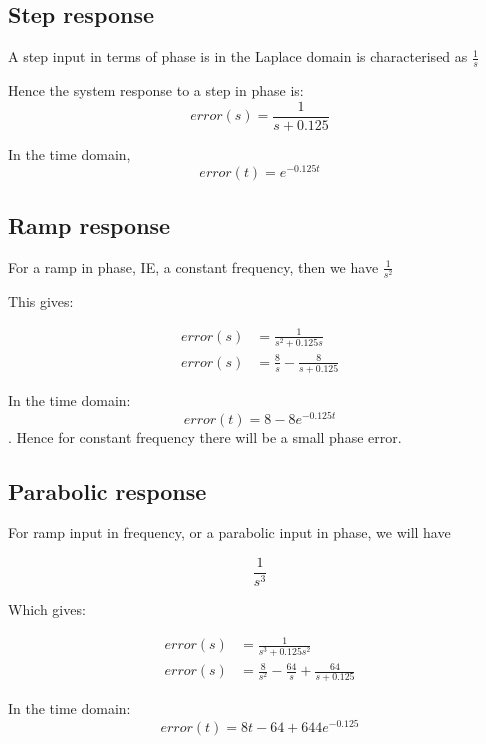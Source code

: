 \subsection{Step response}
A step input in terms of phase is in the Laplace domain is characterised as  $\frac{1}{s}$

Hence the system response to a step in phase is:
\begin{equation}
error(s) = \frac{1}{s+0.125}
\end{equation}

In the time domain,
\begin{equation}
 error(t) =  e^{-0.125t}
\end{equation}


\subsection{Ramp response}
For a ramp in phase, IE, a constant frequency, then we have $\frac{1}{s^2}$

This gives:

\begin{align}
error(s) &= \frac{1}{s^2+0.125s}\\
error(s) &= \frac{8}{s} - \frac{8}{s+0.125} 
\end{align}

In the time domain:
\begin{equation}
error(t) =  8 - 8e^{-0.125t}
\end{equation}
.
Hence for constant frequency there will be a small phase error.

\subsection{Parabolic response}
For ramp input in frequency, or a parabolic input in phase, we will have 

\begin{equation}
\frac{1}{s^3}
\end{equation}

Which gives: 

\begin{align}
error(s) &= \frac{1}{s^3+0.125s^2}\\
error(s) &= \frac{8}{s^2} - \frac{64}{s} + \frac{64}{s+0.125}
\end{align}

In the time domain:
\begin{equation}
error(t) =  8t - 64 + 644 e^{-0.125}
\end{equation}

